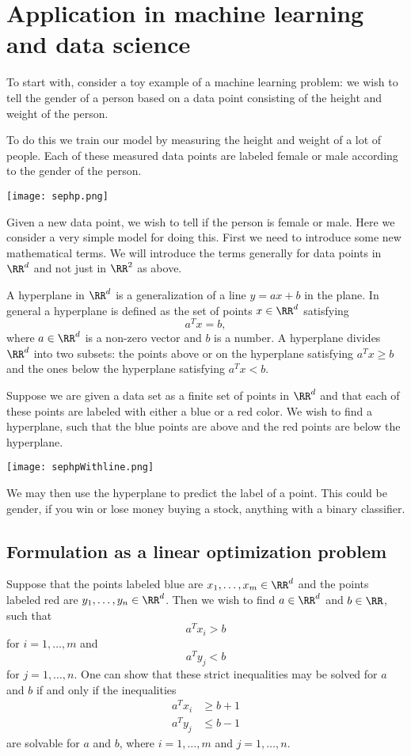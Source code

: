 \documentclass{article}
\begin{document}
\endshex

  
\section{Application in machine learning and data science}


To start with, consider a toy example of a machine learning problem: we wish
to tell the gender of a person based on a data point consisting of
the height and weight of the person.

To do this we train our model by measuring the height and weight of a
lot of people. Each of these measured data points are labeled
female or male according to the gender of the person.

\texttt{[image: sephp.png]}

Given a new data point, we wish to tell if the person is female or male. Here we
consider a very simple model for doing this. First we need to introduce some
new mathematical terms. We will introduce the terms generally for
data points in $\RR^d$ and not just in $\RR^2$ as above.


A hyperplane in $\RR^d$ is a generalization of a line $y = a x + b$ in the plane. In general
a hyperplane is defined as the set of points $x\in \RR^d$ satisfying
$$
a^T x = b,
$$
where $a\in \RR^d$ is a non-zero vector and $b$ is a number. A hyperplane divides $\RR^d$
into two subsets: the points above or on the hyperplane satisfying $a^T x \geq b$ and the ones
below the hyperplane satisfying $a^T x < b$.


Suppose we are given a data set as a finite set of points in $\RR^d$ and that each of
these points are labeled with either a blue or a red color. We wish to
find a hyperplane, such that the blue points are above and the red points
are below the hyperplane.

\texttt{[image: sephpWithline.png]}


We may then use the hyperplane to predict the label of a point. This could be
gender, if you win or lose money buying a stock, anything with
a binary classifier.



  
  \subsection{Formulation as a linear optimization problem}

  Suppose that the points labeled blue are $x_1, \dots, x_m\in \RR^d$ and
  the points labeled red are $y_1, \dots, y_n\in \RR^d$. Then we wish to
  find $a\in \RR^d$ and $b\in \RR$, such that
  $$
  a^T x_i > b
  $$
  for $i = 1, \dots, m$ and
  $$
  a^T y_j < b
  $$
  for $j = 1, \dots, n$. One can show that these strict inequalities may be solved 
  for $a$ and $b$ if and only if the inequalities
  \begin{align*}
  a^T x_i &\geq b + 1\\
  a^T y_j &\leq b - 1
  \end{align*}
  are solvable for $a$ and $b$, where $i = 1, \dots, m$ and $j = 1, \dots, n$.
  
\end{document}

